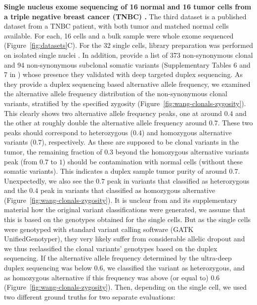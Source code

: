 \documentclass[authoryear,preprint,11pt]{scrartcl}
\begin{document}
\textbf{Single nucleus exome sequencing of 16 normal and 16 tumor cells from a triple negative breast cancer (TNBC) \citep{wang_clonal_2014}.}
The third dataset is a published dataset from a TNBC patient, with both tumor and matched normal cells available.
For each, 16 cells and a bulk sample were whole exome sequenced (Figure~\ref{fig:datasets}C).
For the 32 single cells, library preparation was performed on isolated single nuclei \citep{wang_clonal_2014}.
In addition, \cite{wang_clonal_2014} provide a list of 373 non-synonymous clonal and 94 non-synonymous subclonal somatic variants (Supplementary Tables 6 and 7 in \cite{wang_clonal_2014}) whose presence they validated with deep targeted duplex sequencing.
As they provide a duplex sequencing based alternative allele frequency, we examined the alternative allele frequency distribution of the non-synonymous clonal variants, stratified by the specified zygosity (Figure~\ref{fig:wang-clonals-zygosity}).
This clearly shows two alternative allele frequency peaks, one at around $0.4$ and the other at roughly double the alternative allele frequency around $0.7$.
These two peaks should correspond to heterozygous ($0.4$) and homozygous alternative variants ($0.7$), respectively.
As these are supposed to be clonal variants in the tumor, the remaining fraction of $0.3$ beyond the homozygous alternative variants peak (from $0.7$ to $1$) should be contamination with normal cells (without these somatic variants).
This indicates a duplex sample tumor purity of around $0.7$.
Unexpectedly, we also see the $0.7$ peak in variants that \cite{wang_clonal_2014} classified as heterozygous and the $0.4$ peak in variants that \cite{wang_clonal_2014} classified as homozygous alternative (Figure~\ref{fig:wang-clonals-zygosity}).
It is unclear from \cite{wang_clonal_2014} and its supplementary material how the original variant classifications were generated, we assume that this is based on the genotypes obtained for the single cells.
But as the single cells were genotyped with standard variant calling software (GATK UnifiedGenotyper), they very likely suffer from considerable allelic dropout and we thus reclassified the clonal variants' genotypes based on the duplex sequencing.
If the alternative allele frequency determined by the ultra-deep duplex sequencing was below $0.6$, we classified the variant as heterozygous, and as homozygous alternative if this frequency was above (or equal to) $0.6$ (Figure~\ref{fig:wang-clonals-zygosity}).
Then, depending on the single cell, we used two different ground truths for two separate evaluations:
\end{document}

